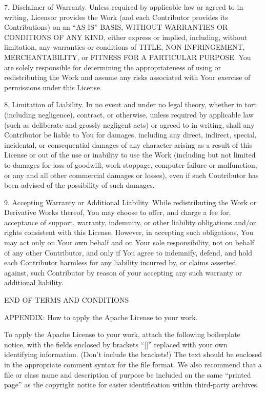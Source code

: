 \documentclass[letterpaper,10pt,english]{sphinxmanual}
\begin{document}
7. Disclaimer of Warranty. Unless required by applicable law or
agreed to in writing, Licensor provides the Work (and each
Contributor provides its Contributions) on an “AS IS” BASIS,
WITHOUT WARRANTIES OR CONDITIONS OF ANY KIND, either express or
implied, including, without limitation, any warranties or conditions
of TITLE, NON-INFRINGEMENT, MERCHANTABILITY, or FITNESS FOR A
PARTICULAR PURPOSE. You are solely responsible for determining the
appropriateness of using or redistributing the Work and assume any
risks associated with Your exercise of permissions under this License.

8. Limitation of Liability. In no event and under no legal theory,
whether in tort (including negligence), contract, or otherwise,
unless required by applicable law (such as deliberate and grossly
negligent acts) or agreed to in writing, shall any Contributor be
liable to You for damages, including any direct, indirect, special,
incidental, or consequential damages of any character arising as a
result of this License or out of the use or inability to use the
Work (including but not limited to damages for loss of goodwill,
work stoppage, computer failure or malfunction, or any and all
other commercial damages or losses), even if such Contributor
has been advised of the possibility of such damages.

9. Accepting Warranty or Additional Liability. While redistributing
the Work or Derivative Works thereof, You may choose to offer,
and charge a fee for, acceptance of support, warranty, indemnity,
or other liability obligations and/or rights consistent with this
License. However, in accepting such obligations, You may act only
on Your own behalf and on Your sole responsibility, not on behalf
of any other Contributor, and only if You agree to indemnify,
defend, and hold each Contributor harmless for any liability
incurred by, or claims asserted against, such Contributor by reason
of your accepting any such warranty or additional liability.

END OF TERMS AND CONDITIONS

APPENDIX: How to apply the Apache License to your work.

To apply the Apache License to your work, attach the following
boilerplate notice, with the fields enclosed by brackets “{[}{]}”
replaced with your own identifying information. (Don’t include
the brackets!)  The text should be enclosed in the appropriate
comment syntax for the file format. We also recommend that a
file or class name and description of purpose be included on the
same “printed page” as the copyright notice for easier
identification within third-party archives.
\end{document}
